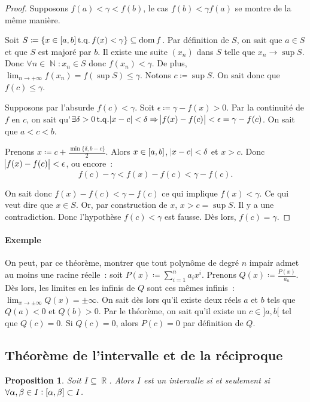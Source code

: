 \documentclass{article}
\DeclareMathOperator{\dom}{dom}
\DeclareMathOperator{\N}{\mathbb N}
\DeclareMathOperator{\R}{\mathbb R}
\DeclareMathOperator{\tq}{ t.q. }
\newcommand{\ab}{\interval ab}
\newtheorem{prp}[thm]{Proposition}
\theoremstyle{definition}
\theoremstyle{remark}
\begin{document}
		\begin{proof} Supposons $f(a) < \gamma < f(b)$, le cas $f(b) < \gamma f(a)$ se montre de la même manière.

		Soit $S \coloneqq \{x \in \ab \tq f(x) < \gamma\} \subseteq \dom f$. Par définition de $S$, on sait que $a \in S$ et que $S$ est majoré par $b$.
		Il existe une suite $(x_n)$ dans $S$ telle que $x_n \to \sup S$. Donc $\forall n \in \N : x_n \in S$ donc $f(x_n) < \gamma$. De plus,
		$\lim_{n\to+\infty}f(x_n) = f(\sup S) \leq \gamma$. Notons $c \coloneqq \sup S$. On sait donc que $f(c) \leq \gamma$.

		Supposons par l'absurde $f(c) < \gamma$. Soit $\epsilon \coloneqq \gamma - f(x) > 0$. Par la continuité de $f$ en $c$, on sait
		qu'$\exists \delta > 0 \tq \abs{x-c} < \delta \Rightarrow \abs{f(x)-f(c)} < \epsilon = \gamma-f(c)$. On sait que $a < c < b$.

		Prenons $x \coloneqq c + \frac {\min\{\delta, b-c\}}2$. Alors $x \in \ab$, $\abs{x -c} < \delta$ et $x > c$. Donc $\abs{f(x) - f(c)} < \epsilon$,
		ou encore~:
		\[f(c) - \gamma < f(x) - f(c) < \gamma - f(c).\]

		On sait donc $f(x)-f(c) < \gamma-f(c)$ ce qui implique $f(x) < \gamma$. Ce qui veut dire que $x \in S$. Or, par construction de $x$, $x > c = \sup S$.
		Il y a une contradiction. Donc l'hypothèse $f(c) < \gamma$ est fausse. Dès lors, $f(c) = \gamma$. \end{proof}

		\paragraph{Exemple} On peut, par ce théorème, montrer que tout polynôme de degré $n$ impair admet au moins une racine réelle~: soit
		$P(x) \coloneqq \sum_{i=1}^{n}a_ix^i$. Prenons $Q(x) \coloneqq \frac {P(x)}{a_n}$. Dès lors, les limites en les infinis de $Q$ sont ces mêmes infinis~:
		$\lim_{x\to\pm\infty}Q(x) = \pm\infty$. On sait dès lors qu'il existe deux réels $a$ et $b$ tels que $Q(a) < 0$ et $Q(b) > 0$. Par le théorème, on sait qu'il
		existe un $c \in ]a, b[$ tel que $Q(c) = 0$. Si $Q(c) = 0$, alors $P(c) = 0$ par définition de $Q$.
	
	\subsection{Théorème de l'intervalle et de la réciproque}
		
		\begin{prp} Soit $I \subseteq \R$. Alors $I$ est un intervalle si et seulement si $\forall \alpha, \beta \in I : \interval \alpha\beta \subset I$.
		\end{prp}
\end{document}
